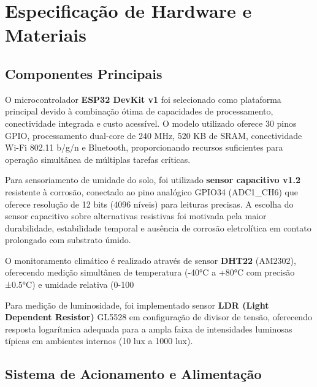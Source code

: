 
\section{Especificação de Hardware e Materiais}

\subsection{Componentes Principais}

O microcontrolador \textbf{ESP32 DevKit v1} foi selecionado como plataforma principal devido à combinação ótima de capacidades de processamento, conectividade integrada e custo acessível. O modelo utilizado oferece 30 pinos GPIO, processamento dual-core de 240 MHz, 520 KB de SRAM, conectividade Wi-Fi 802.11 b/g/n e Bluetooth, proporcionando recursos suficientes para operação simultânea de múltiplas tarefas críticas.

Para sensoriamento de umidade do solo, foi utilizado \textbf{sensor capacitivo v1.2} resistente à corrosão, conectado ao pino analógico GPIO34 (ADC1_CH6) que oferece resolução de 12 bits (4096 níveis) para leituras precisas. A escolha do sensor capacitivo sobre alternativas resistivas foi motivada pela maior durabilidade, estabilidade temporal e ausência de corrosão eletrolítica em contato prolongado com substrato úmido.

O monitoramento climático é realizado através de sensor \textbf{DHT22} (AM2302), oferecendo medição simultânea de temperatura (-40°C a +80°C com precisão ±0.5°C) e umidade relativa (0-100%

Para medição de luminosidade, foi implementado sensor \textbf{LDR (Light Dependent Resistor)} GL5528 em configuração de divisor de tensão, oferecendo resposta logarítmica adequada para a ampla faixa de intensidades luminosas típicas em ambientes internos (10 lux a 1000 lux).

\subsection{Sistema de Acionamento e Alimentação}


